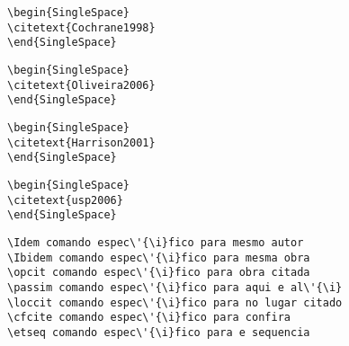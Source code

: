 \begin{alineas}
\begin{verbatim}
\begin{SingleSpace} 
\citetext{Cochrane1998}
\end{SingleSpace}
\end{verbatim}


\begin{verbatim}
\begin{SingleSpace} 
\citetext{Oliveira2006}
\end{SingleSpace}
\end{verbatim}


\begin{verbatim}
\begin{SingleSpace} 
\citetext{Harrison2001}
\end{SingleSpace}
\end{verbatim}


\begin{verbatim}
\begin{SingleSpace} 
\citetext{usp2006}
\end{SingleSpace}
\end{verbatim}


\quad

\item
\begin{verbatim}
\Idem comando espec\'{\i}fico para mesmo autor
\Ibidem comando espec\'{\i}fico para mesma obra
\opcit comando espec\'{\i}fico para obra citada
\passim comando espec\'{\i}fico para aqui e al\'{\i}
\loccit comando espec\'{\i}fico para no lugar citado
\cfcite comando espec\'{\i}fico para confira
\etseq comando espec\'{\i}fico para e sequencia 
\end{verbatim} 


\end{alineas}

